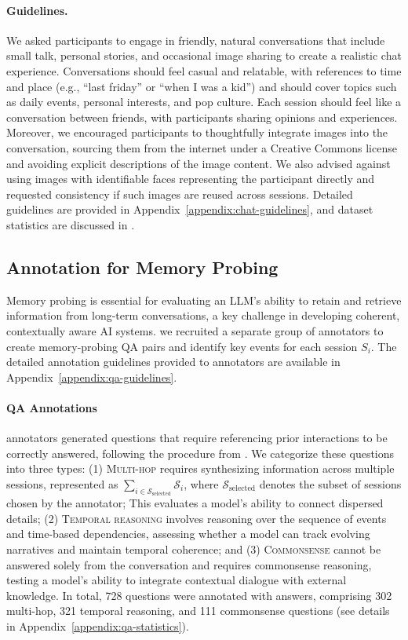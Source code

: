 \paragraph{Guidelines.}
We asked participants to engage in friendly, natural conversations that include small talk, personal stories, and occasional image sharing to create a realistic chat experience. 
Conversations should feel casual and relatable, with references to time and place (e.g., ``last friday'' or ``when I was a kid'') and should cover topics such as daily events, personal interests, and pop culture.
Each session should feel like a conversation between friends, with participants sharing opinions and experiences.
Moreover, we encouraged participants to thoughtfully integrate images into the conversation, sourcing them from the internet under a Creative Commons license and avoiding explicit descriptions of the image content. 
We also advised against using images with identifiable faces representing the participant directly and requested consistency if such images are reused across sessions. 
Detailed guidelines are provided in Appendix~\ref{appendix:chat-guidelines}, and dataset statistics are discussed in .


\subsection{Annotation for Memory Probing}
\label{ssec:subtask-annotation}
Memory probing is essential for evaluating an LLM’s ability to retain and retrieve information from long-term conversations, a key challenge in developing coherent, contextually aware AI systems.
we recruited a separate group of annotators to create memory-probing QA pairs and identify key events for each session $S_i$.
The detailed annotation guidelines provided to annotators are available in Appendix~\ref{appendix:qa-guidelines}.

\paragraph{QA Annotations}
annotators generated questions that require referencing prior interactions to be correctly answered, following the procedure from \citet{maharana-etal-2024-evaluating}. 
We categorize these questions into three types:
(1) \textsc{Multi-hop} requires synthesizing information across multiple sessions, represented as \( \sum_{i \in \mathcal{S}_{\text{selected}}} \mathcal{S}_i \), where \( \mathcal{S}_{\text{selected}} \) denotes the subset of sessions chosen by the annotator;
This evaluates a model’s ability to connect dispersed details;
(2) \textsc{Temporal reasoning} involves reasoning over the sequence of events and time-based dependencies, assessing whether a model can track evolving narratives and maintain temporal coherence; and
(3) \textsc{Commonsense} cannot be answered solely from the conversation and requires commonsense reasoning, testing a model’s ability to integrate contextual dialogue with external knowledge.
In total, 728 questions were annotated with answers, comprising 302 multi-hop, 321 temporal reasoning, and 111 commonsense questions (see details in Appendix~\ref{appendix:qa-statistics}).

